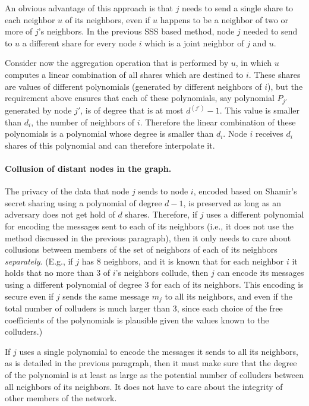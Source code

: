 \documentclass[10pt]{svjour3}
\begin{document}
An obvious  advantage of this approach is that $j$
needs to send a single share to each neighbor $u$ of its neighbors,
even if $u$ happens to be a neighbor of two or more of $j$'s
neighbors. In the previous SSS based method, node $j$ needed to send
to $u$ a different share for every node $i$ which is a joint neighbor
of $j$ and $u$.

Consider now  the aggregation operation that is performed by $u$, in which
$u$ computes a linear combination of all shares which are destined to
$i$. These shares are values of different polynomials (generated by
different neighbors of $i$), but the requirement above ensures  that
 each of
these polynomials, say polynomial $P_{j'}$ generated by node $j'$,
is of degree that is
at most $d^{(j')}-1$. This value is smaller than
 $d_i$, the number of neighbors of
$i$. Therefore the linear combination of these polynomials is a
polynomial whose degree is smaller than $d_i$. Node $i$ receives $d_i$
shares of this polynomial and  can therefore interpolate it.




\paragraph{Collusion of  distant nodes in the graph.}
The privacy of the data that node $j$ sends to node $i$, encoded based
on Shamir's secret sharing using a polynomial of degree $d-1$, is
preserved as long as an adversary does not get hold of $d$ shares.
Therefore, if $j$ uses a different polynomial for encoding the
messages sent to each of its neighbors (i.e., it does not use the
method discussed in the previous paragraph), then it only needs to
care about collusions between members of the set of neighbors of each
of its neighbors {\em separately}. (E.g., if $j$ has 8 neighbors, and
it is known that for each neighbor $i$ it holds that no more than 3 of
$i$'s neighbors collude, then $j$ can encode its messages using a
different polynomial of degree 3 for each of its neighbors. This
encoding is secure even if $j$ sends the same message $m_j$ to all its
neighbors, and even if the total number of colluders is much larger
than 3, since each choice of the free coefficients of the polynomials
is plausible given the values known to the colluders.)

If $j$ uses a single polynomial to encode the messages it sends to all
its neighbors, as is detailed in the previous paragraph, then it must
make sure that the degree of the polynomial is at least as large as
the potential number of colluders between all neighbors of its
neighbors. It does not have to care about the integrity of other
members of the network.
\end{document}
